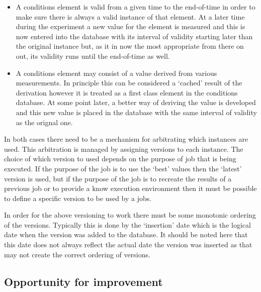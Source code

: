 \begin{itemize}
\item A conditions element is valid from a given time to the end-of-time in order to make sure there is always a valid instance of that element. At a later time during the experiment a new value for the element is measured and this is now entered into the database with its interval of validity starting later than the original instance but, as it in now the most appropriate from there on out, its validity runs until the end-of-time as well.

\item A conditions element may consist of a value derived from various measurements. In principle this can be considered a `cached' result of the derivation however it is treated as a first class element in the conditions database. At some point later, a better way of deriving the value is developed and this new value is placed in the database with the same interval of validity as the orignal one.
\end{itemize}

In both cases there need to be a mechanism for arbitrating which instances are used. This arbitration is managed by assigning versions to each instance. The choice of which version to used depends on the purpose of job that is being executed. If the purpose of the job is to use the `best' values then the `latest' version is used, but if the purpose of the job is to recreate the results of a previous job or to provide a know execution environment then it must be possible to define a specific version to be used by a jobs.

In order for the above versioning to work there must be some monotonic ordering of the versions. Typically this is done by the `insertion' date which is the logical date when the version was added to the database. It should be noted here that this date does not always reflect the actual date the version was inserted as that may not create the correct ordering of versions.


\subsection{Opportunity for improvement}

